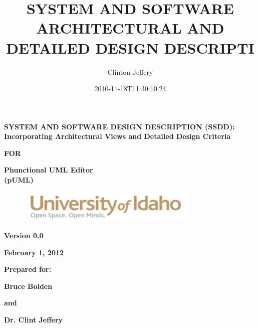 \documentclass[twoside,letterpaper]{article}
\title{SYSTEM AND SOFTWARE ARCHITECTURAL AND DETAILED DESIGN DESCRIPTI}
\author{Clinton Jeffery}
\date{2010-11-18T11:30:10.24}
\begin{document}
\clearpage

{\centering{}\bfseries\color{black}
SYSTEM AND SOFTWARE DESIGN DESCRIPTION (SSDD): Incorporating
Architectural Views and Detailed Design Criteria
\par}

{\centering{}\bfseries\color{black}
FOR
\par}


\bigskip

{\centering{}\bfseries\color{black}
Phunctional UML Editor
\\(pUML)
\par}


\bigskip


\bigskip


\bigskip

{\centering \par}

\begin{figure}
\centering
\includegraphics[width=3.4354in,height=0.6126in]{SSDDTemplateA2-img1.png}
\end{figure}

\bigskip


\bigskip


\bigskip


\bigskip

{\centering{}\bfseries\color{black}
Version 0.0
\par}

{\centering{}\bfseries\color{black}
February 1, 2012
\par}


\bigskip


\bigskip

{\centering{}\bfseries\color{black}
Prepared for:
\par}
{\centering{}\bfseries\color{black}
Bruce Bolden
\par}
{\centering{}\bfseries\color{black}
and
\par}
{\centering{}\bfseries\color{black}
Dr. Clint Jeffery
\par}

\bigskip
\end{document}
